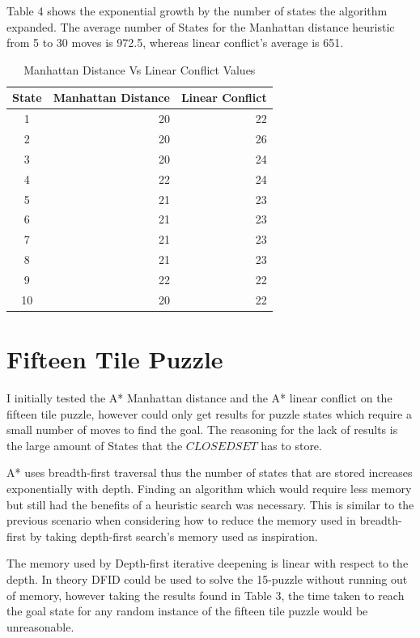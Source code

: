 \documentclass[final]{cmpreport}
\begin{document}
  Table 4 shows the exponential growth by the number of states the algorithm expanded. The average number of States for the Manhattan distance heuristic from 5 to 30 moves is 972.5, whereas linear conflict's average is 651.


\begin{table}[ht]
	\caption{Manhattan Distance Vs Linear Conflict Values}
	\begin{center}
		\begin{tabular}{crr} \hline
			State & Manhattan Distance  & Linear Conflict    \\ \hline
			1  & 20 & 22  \\
			2 & 20  & 26 \\ 
			3 & 20 & 24  \\ 
			4 & 22 & 24  \\
		    5 & 21  & 23 \\ 
			6 & 21 & 23  \\ 
			7 & 21 & 23  \\ 
			8 & 21 & 23  \\ 
			9 & 22 & 22  \\ 
			10 & 20 & 22  \\ \hline
		\end{tabular}
	\end{center}
\end{table}


\section{Fifteen Tile Puzzle}
I initially tested the A* Manhattan distance and the A* linear conflict on the fifteen tile puzzle, however could only get results for puzzle states which require a small number of moves to find the goal. The reasoning for the lack of results is the large amount of States that the $CLOSEDSET$ has to store. 

A* uses breadth-first traversal thus the number of states that are stored increases exponentially with depth. Finding an algorithm which would require less memory but still had the benefits of a heuristic search was necessary. This is similar to the previous scenario when considering how to reduce the memory used in breadth-first by taking depth-first search's memory used as inspiration.

The memory used by Depth-first iterative deepening is linear with respect to the depth. In theory DFID could be used to solve the 15-puzzle without running out of memory, however taking the results found in Table 3, the time taken to reach the goal state for any random instance of the fifteen tile puzzle would be unreasonable.
\end{document}
